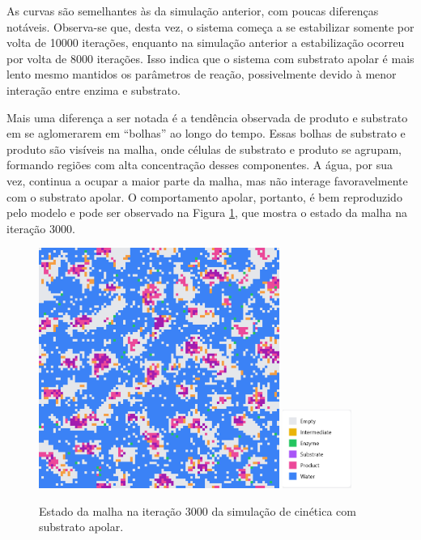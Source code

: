 \documentclass[12pt,oneside]{report}
\begin{document}
As curvas são semelhantes às da simulação anterior, com poucas diferenças notáveis. Observa-se que, desta vez, o sistema começa a se estabilizar somente por volta de 10000 iterações, enquanto na simulação anterior a estabilização ocorreu por volta de 8000 iterações. Isso indica que o sistema com substrato apolar é mais lento mesmo mantidos os parâmetros de reação, possivelmente devido à menor interação entre enzima e substrato.

Mais uma diferença a ser notada é a tendência observada de produto e substrato em se aglomerarem em ``bolhas'' ao longo do tempo. Essas bolhas de substrato e produto são visíveis na malha, onde células de substrato e produto se agrupam, formando regiões com alta concentração desses componentes. A água, por sua vez, continua a ocupar a maior parte da malha, mas não interage favoravelmente com o substrato apolar. O comportamento apolar, portanto, é bem reproduzido pelo modelo e pode ser observado na Figura \ref{fig:MM_apolar_3000it}, que mostra o estado da malha na iteração 3000.

\begin{figure}[H]
    \centering
    \includegraphics[width=0.7\textwidth]{img/apolar_3000.png}
    \hspace{0.05\textwidth}
    \includegraphics[width=0.2\textwidth]{img/legend.png}
    \caption{\small Estado da malha na iteração 3000 da simulação de cinética com substrato apolar.}
    \label{fig:MM_apolar_3000it}
\end{figure}
\end{document}
